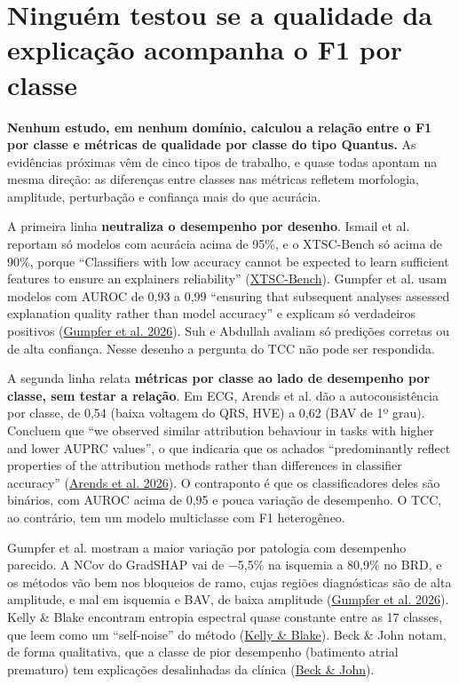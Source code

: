 \documentclass[11pt,a4paper]{article}
\begin{document}
\section{Ninguém testou se a qualidade da explicação acompanha o F1 por classe}

\textbf{Nenhum estudo, em nenhum domínio, calculou a relação entre o F1 por classe e métricas de qualidade por classe do tipo Quantus.} As evidências próximas vêm de cinco tipos de trabalho, e quase todas apontam na mesma direção: as diferenças entre classes nas métricas refletem morfologia, amplitude, perturbação e confiança mais do que acurácia.

A primeira linha \textbf{neutraliza o desempenho por desenho}. Ismail et al. reportam só modelos com acurácia acima de 95\%, e o XTSC-Bench só acima de 90\%, porque ``Classifiers with low accuracy cannot be expected to learn sufficient features to ensure an explainers reliability'' (\href{https://arxiv.org/abs/2310.14957}{XTSC-Bench}). Gumpfer et al. usam modelos com AUROC de 0,93 a 0,99 ``ensuring that subsequent analyses assessed explanation quality rather than model accuracy'' e explicam só verdadeiros positivos (\href{https://arxiv.org/abs/2607.24035}{Gumpfer et al. 2026}). Suh e Abdullah avaliam só predições corretas ou de alta confiança. Nesse desenho a pergunta do TCC não pode ser respondida.

A segunda linha relata \textbf{métricas por classe ao lado de desempenho por classe, sem testar a relação}. Em ECG, Arends et al. dão a autoconsistência por classe, de 0,54 (baixa voltagem do QRS, HVE) a 0,62 (BAV de 1º grau). Concluem que ``we observed similar attribution behaviour in tasks with higher and lower AUPRC values'', o que indicaria que os achados ``predominantly reflect properties of the attribution methods rather than differences in classifier accuracy'' (\href{https://pmc.ncbi.nlm.nih.gov/articles/PMC12980500/}{Arends et al. 2026}). O contraponto é que os classificadores deles são binários, com AUROC acima de 0,95 e pouca variação de desempenho. O TCC, ao contrário, tem um modelo multiclasse com F1 heterogêneo.

Gumpfer et al. mostram a maior variação por patologia com desempenho parecido. A NCov do GradSHAP vai de −5,5\% na isquemia a 80,9\% no BRD, e os métodos vão bem nos bloqueios de ramo, cujas regiões diagnósticas são de alta amplitude, e mal em isquemia e BAV, de baixa amplitude (\href{https://arxiv.org/abs/2607.24035}{Gumpfer et al. 2026}). Kelly \& Blake encontram entropia espectral quase constante entre as 17 classes, que leem como um ``self-noise'' do método (\href{https://arxiv.org/html/2606.24974}{Kelly \& Blake}). Beck \& John notam, de forma qualitativa, que a classe de pior desempenho (batimento atrial prematuro) tem explicações desalinhadas da clínica (\href{https://arxiv.org/html/2508.17294v1}{Beck \& John}).
\end{document}
